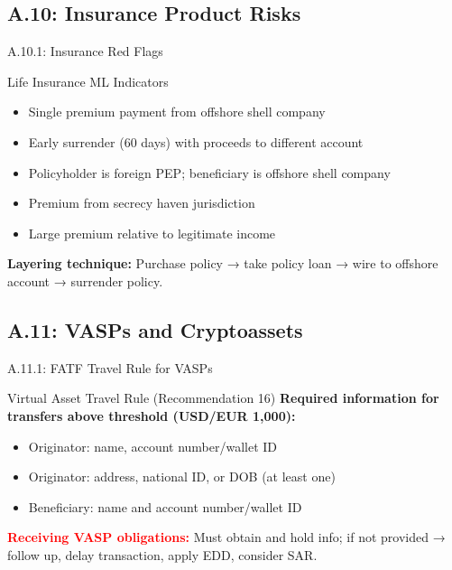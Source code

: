 \documentclass{beamer}
\begin{document}
	\subsection{A.10: Insurance Product Risks}
	
	\begin{frame}{A.10.1: Insurance Red Flags}
		\begin{block}{Life Insurance ML Indicators}
			\begin{itemize}
				\item Single premium payment from offshore shell company
				\item Early surrender (60 days) with proceeds to different account
				\item Policyholder is foreign PEP; beneficiary is offshore shell company
				\item Premium from secrecy haven jurisdiction
				\item Large premium relative to legitimate income
			\end{itemize}
		\end{block}
		\textbf{Layering technique:} Purchase policy → take policy loan → wire to offshore account → surrender policy.
	\end{frame}
	
	\subsection{A.11: VASPs and Cryptoassets}
	
	\begin{frame}{A.11.1: FATF Travel Rule for VASPs}
		\begin{block}{Virtual Asset Travel Rule (Recommendation 16)}
			\textbf{Required information for transfers above threshold (USD/EUR 1,000):}
			\begin{itemize}
				\item Originator: name, account number/wallet ID
				\item Originator: address, national ID, or DOB (at least one)
				\item Beneficiary: name and account number/wallet ID
			\end{itemize}
		\end{block}
		\textcolor{red}{\textbf{ Receiving VASP obligations:}} Must obtain and hold info; if not provided → follow up, delay transaction, apply EDD, consider SAR.
	\end{frame}
	
\end{document}
